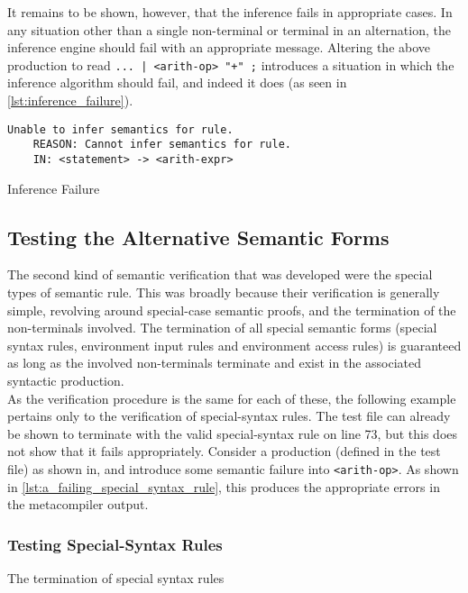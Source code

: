 It remains to be shown, however, that the inference fails in appropriate cases.
In any situation other than a single non-terminal or terminal in an alternation, the inference engine should fail with an appropriate message. 
Altering the above production to read \texttt{... | <arith-op> "+" ;} introduces a situation in which the inference algorithm should fail, and indeed it does (as seen in \autoref{lst:inference_failure}).

\begin{listing}[!htb]
\begin{verbatim}
Unable to infer semantics for rule.
    REASON: Cannot infer semantics for rule.
    IN: <statement> -> <arith-expr>
\end{verbatim}
\caption{Inference Failure}
\label{lst:inference_failure}
\end{listing}


\subsection{Testing the Alternative Semantic Forms} %
\label{sub:testing_the_alternative_semantic_forms}
The second kind of semantic verification that was developed were the special types of semantic rule.
This was broadly because their verification is generally simple, revolving around special-case semantic proofs, and the termination of the non-terminals involved.
The termination of all special semantic forms (special syntax rules, environment input rules and environment access rules) is guaranteed as long as the involved non-terminals terminate and exist in the associated syntactic production. \\

As the verification procedure is the same for each of these, the following example pertains only to the verification of special-syntax rules. 
The test file can already be shown to terminate with the valid special-syntax rule on line 73, but this does not show that it fails appropriately.
Consider a production (defined in the test file) as shown in, and introduce some semantic failure into \texttt{<arith-op>}.
As shown in \autoref{lst:a_failing_special_syntax_rule}, this produces the appropriate errors in the metacompiler output. 

\subsubsection{Testing Special-Syntax Rules} %
\label{ssub:testing_special_syntax_rules}
The termination of special syntax rules 

